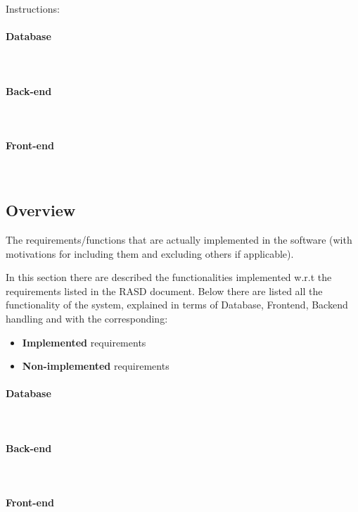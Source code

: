 Instructions:
\paragraph{Database} \mbox{}\\  \paragraph{Back-end} \mbox{}\\  \paragraph{Front-end} \mbox{}\\\subsection{Overview}
The requirements/functions that are actually implemented in the software (with motivations for including them and excluding others if applicable).


In this section there are described the functionalities implemented w.r.t the requirements listed in the RASD document.
Below there are listed all the functionality of the system, explained in terms of Database, Frontend, Backend handling and with the corresponding:
\begin{itemize}
    \item \textbf{Implemented} requirements
    \item \textbf{Non-implemented} requirements
\end{itemize}

\paragraph{Database} \mbox{}\\  \paragraph{Back-end} \mbox{}\\  \paragraph{Front-end} \mbox{}\\

